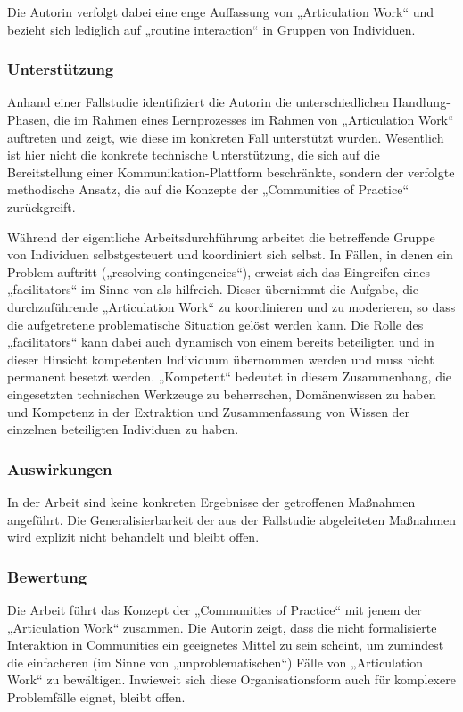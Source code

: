 Die Autorin verfolgt dabei eine enge Auffassung von „Articulation Work“ und bezieht sich lediglich auf „routine interaction“ in Gruppen von Individuen.

\subsubsection{Unterstützung}

Anhand einer Fallstudie identifiziert die Autorin die unterschiedlichen Handlung-Phasen, die im Rahmen eines Lernprozesses im Rahmen von „Articulation Work“ auftreten und zeigt, wie diese im konkreten Fall unterstützt wurden. Wesentlich ist hier nicht die konkrete technische Unterstützung, die sich auf die Bereitstellung einer Kommunikation-Plattform beschränkte, sondern der verfolgte methodische Ansatz, die auf die Konzepte der „Communities of Practice“ zurückgreift.

Während der eigentliche Arbeitsdurchführung arbeitet die betreffende Gruppe von Individuen selbstgesteuert und koordiniert sich selbst. In Fällen, in denen ein Problem auftritt („resolving contingencies“), erweist sich das Eingreifen eines „facilitators“ im Sinne von \citet{Wenger99} als hilfreich. Dieser übernimmt die Aufgabe, die durchzuführende „Articulation Work“ zu koordinieren und zu moderieren, so dass die aufgetretene problematische Situation gelöst werden kann. Die Rolle des „facilitators“ kann dabei auch dynamisch von einem bereits beteiligten und in dieser Hinsicht kompetenten Individuum übernommen werden und muss nicht permanent besetzt werden. „Kompetent“ bedeutet in diesem Zusammenhang, die eingesetzten technischen Werkzeuge zu beherrschen, Domänenwissen zu haben und Kompetenz in der Extraktion und Zusammenfassung von Wissen der einzelnen beteiligten Individuen zu haben.

\subsubsection{Auswirkungen}

In der Arbeit sind keine konkreten Ergebnisse der getroffenen Maßnahmen angeführt. Die Generalisierbarkeit der aus der Fallstudie abgeleiteten Maßnahmen wird explizit nicht behandelt und bleibt offen.

\subsubsection{Bewertung}
Die Arbeit führt das Konzept der „Communities of Practice“ mit jenem der „Articulation Work“ zusammen. Die Autorin zeigt, dass die nicht formalisierte Interaktion in Communities ein geeignetes Mittel zu sein scheint, um zumindest die einfacheren (im Sinne von „unproblematischen“) Fälle von „Articulation Work“ zu bewältigen. Inwieweit sich diese Organisationsform auch für komplexere Problemfälle eignet, bleibt offen.


